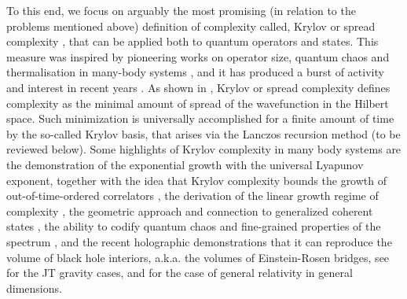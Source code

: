 \documentclass[aps,prl,twocolumn,showpacs,preprintnumbers,amsmath,amssymb]{revtex4-1}
\begin{document}
To this end, we focus on arguably the most promising (in relation to the problems mentioned above) definition of complexity called, Krylov \cite{Parker:2018yvk} or spread complexity \cite{Balasubramanian:2022tpr}, that can be applied both to quantum operators and states. This measure was inspired by pioneering works on operator size, quantum chaos and thermalisation in many-body systems \cite{Roberts:2018mnp,Qi:2018bje}, and it has produced a burst of activity and interest in recent years \cite{Barbon:2019wsy,Magan:2020iac,Rabinovici:2020ryf,Dymarsky:2021bjq,Kar:2021nbm,Caputa:2021sib,Patramanis:2021lkx,Caputa:2021ori,Caputa:2022eye,Caputa:2022yju,Khetrapal:2022dzy,Kundu:2023hbk,Bhattacharjee:2022vlt,Hornedal:2022pkc,Takahashi:2023nkt,Hornedal:2023xpa,Carabba:2022itd,Avdoshkin:2022xuw,Rabinovici:2022beu,Lin:2022rbf,Balasubramanian:2022dnj,Balasubramanian:2022gmo,Camargo:2022rnt,Hashimoto:2023swv,Camargo:2023eev,Bhattacharyya:2023dhp,Patramanis:2023cwz,Lv:2023jbv,Muck:2022xfc,Adhikari:2022whf,Kim:2021okd,Erdmenger:2023shk,Rabinovici:2023yex,Nandy:2023brt,Bhattacharjee:2022qjw,Gautam:2023pny,Dixit:2023fke,Hashimoto:2023swv,Patramanis:2023cwz,Iizuka:2023pov,Bhattacharyya:2023dhp}. As shown in \cite{Balasubramanian:2022tpr}, Krylov or spread complexity defines complexity as the minimal amount of spread of the wavefunction in the Hilbert space. Such minimization is universally accomplished for a finite amount of time by the so-called Krylov basis, that arises via the Lanczos recursion method \cite{LanczosVish} (to be reviewed below). Some highlights of  Krylov complexity in many body systems are the demonstration of the exponential growth with the universal Lyapunov exponent, together with the idea that Krylov complexity bounds the growth of out-of-time-ordered correlators \cite{Parker:2018yvk,Gu:2021xaj}, the derivation of the linear growth regime of complexity \cite{Barbon:2019wsy}, the geometric approach and connection to generalized coherent states \cite{Caputa:2021sib}, the ability to codify quantum chaos and fine-grained properties of the spectrum \cite{Balasubramanian:2022tpr,Balasubramanian:2022dnj,Erdmenger:2023shk}, and the recent holographic demonstrations that it can reproduce the volume of black hole interiors, a.k.a. the volumes of Einstein-Rosen bridges, see \cite{Lin:2022rbf,Erdmenger:2023shk,Rabinovici:2023yex} for the JT gravity cases, and \cite{Balasubramanian:2022gmo} for the case of general relativity in general dimensions.
 
\end{document}
